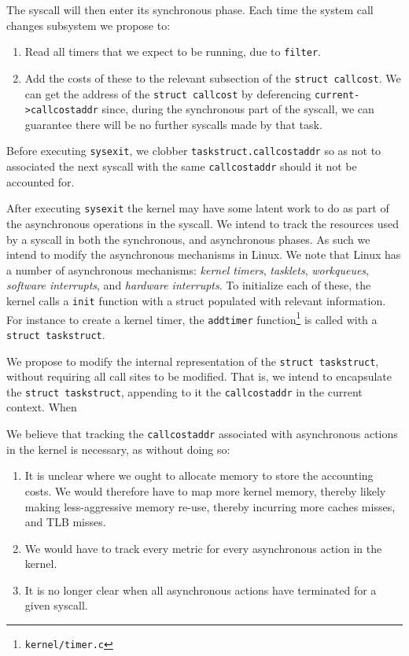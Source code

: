 \documentclass[12pt]{article}
\def\_{\textunderscore\-}
\begin{document}
  The syscall will then enter its synchronous phase. Each time the system call changes subsystem we propose to:
  \begin{enumerate}
  \item Read all timers that we expect to be running, due to \texttt{filter}.
  \item Add the costs of these to the relevant subsection of the \texttt{struct call\_cost}. We can get the address of the \texttt{struct call\_cost} by deferencing \texttt{current->call\_cost\_addr} since, during the synchronous part of the syscall, we can guarantee there will be no further syscalls made by that task.
  \end{enumerate}

  Before executing \texttt{sysexit}, we clobber \texttt{task\_struct.call\_cost\_addr} so as not to associated the next syscall with the same \texttt{call\_cost\_addr} should it not be accounted for.

  After executing \texttt{sysexit} the kernel may have some latent work to do as part of the asynchronous operations in the syscall. We intend to track the resources used by a syscall in both the synchronous, and asynchronous phases. As such we intend to modify the asynchronous mechanisms in Linux.  We note that Linux has a number of asynchronous mechanisms: \emph{kernel timers}, \emph{tasklets}, \emph{workqueues}, \emph{software interrupts}, and \emph{hardware interrupts}. To initialize each of these, the kernel calls a \texttt{\_\_init} function with a struct populated with relevant information. For instance to create a kernel timer, the \texttt{add\_timer} function\footnote{\texttt{kernel/timer.c}} is called with a \texttt{struct task\_struct}.

  We propose to modify the internal representation of the \texttt{struct task\_struct}, without requiring all call sites to be modified. That is, we intend to encapsulate the \texttt{struct task\_struct}, appending to it the \texttt{call\_cost\_addr} in the current context. When

  We believe that tracking the \texttt{call\_cost\_addr} associated with asynchronous actions in the kernel is necessary, as without doing so:
  \begin{enumerate}
  \item It is unclear where we ought to allocate memory to store the accounting costs. We would therefore have to map more kernel memory, thereby likely making less-aggressive memory re-use, thereby incurring more caches misses, and TLB misses.
  \item We would have to track every metric for every asynchronous action in the kernel.
  \item It is no longer clear when all asynchronous actions have terminated for a given syscall.
  \end{enumerate}
\end{document}
